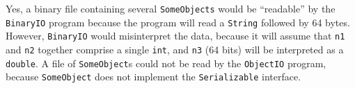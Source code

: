 \begin{ANS}
\item  Yes, a binary file containing several {\tt SomeObjects} would be
``readable'' by the {\tt BinaryIO} program because the program will
read a {\tt String} followed by 64 bytes.  However, {\tt BinaryIO}
would misinterpret the data, because it will assume that {\tt n1} and
{\tt n2} together comprise a single {\tt int}, and {\tt n3} (64 bits)
will be interpreted as a {\tt double}. A file of {\tt SomeObject}s
could not be read by the {\tt ObjectIO} program, because
{\tt SomeObject} does not implement the {\tt Serializable} interface.

\end{ANS}


\label{exercises}
\label{exercises}
